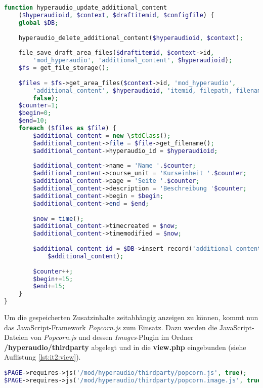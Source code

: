 \begin{lstlisting}[language=php,
             linewidth=\textwidth,
             caption={Ausschnitt der \textbf{locallib.php} in der 2. Iteration},
             label={lst:it2:locallib}]
function hyperaudio_update_additional_content
    ($hyperaudioid, $context, $draftitemid, $configfile) {
    global $DB;
    
    hyperaudio_delete_additional_content($hyperaudioid, $context);
    
    file_save_draft_area_files($draftitemid, $context->id,
        'mod_hyperaudio', 'additional_content', $hyperaudioid);
    $fs = get_file_storage();
    
    $files = $fs->get_area_files($context->id, 'mod_hyperaudio',
        'additional_content', $hyperaudioid, 'itemid, filepath, filename',
        false);
    $counter=1;
    $begin=0;
    $end=10;
    foreach ($files as $file) {        
        $additional_content = new \stdClass();
        $additional_content->file = $file->get_filename();
        $additional_content->hyperaudio_id = $hyperaudioid;
        
        $additional_content->name = 'Name '.$counter;
        $additional_content->course_unit = 'Kurseinheit '.$counter;
        $additional_content->page = 'Seite '.$counter;
        $additional_content->description = 'Beschreibung '$counter;
        $additional_content->begin = $begin;
        $additional_content->end = $end;
        
        $now = time();
        $additional_content->timecreated = $now;
        $additional_content->timemodified = $now;
        
        $additional_content_id = $DB->insert_record('additional_content',
            $additional_content);
		
        $counter++;
        $begin+=15;
        $end+=15;
    }
}
\end{lstlisting}

Um die gespeicherten Zusatzinhalte zeitabhängig anzeigen zu können, kommt nun das JavaScript-Framework \textit{Popcorn.js} zum Einsatz. Dazu werden die JavaScript-Dateien von \textit{Popcorn.js} und dessen \textit{Images}-Plugin im Ordner \textbf{/hyperaudio/thirdparty} abgelegt und in die \textbf{view.php} eingebunden (siehe Auflistung \ref{lst:it2:view}).

\begin{lstlisting}[language=php,
             linewidth=\textwidth,
             caption={Ausschnitt der \textbf{view.php} in der 2. Iteration},
             label={lst:it2:view}]
$PAGE->requires->js('/mod/hyperaudio/thirdparty/popcorn.js', true);
$PAGE->requires->js('/mod/hyperaudio/thirdparty/popcorn.image.js', true);
\end{lstlisting}

